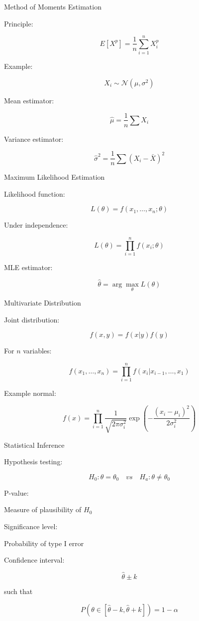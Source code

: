\documentclass[aspectratio=169]{beamer}
\begin{document}
\begin{frame}{Method of Moments Estimation}

Principle:

\[
E[X^p] =
\frac{1}{n}
\sum_{i=1}^{n} X_i^p
\]

Example:

\[
X_i \sim \mathcal{N}(\mu,\sigma^2)
\]

Mean estimator:

\[
\hat{\mu} =
\frac{1}{n}\sum X_i
\]

Variance estimator:

\[
\hat{\sigma}^2 =
\frac{1}{n}\sum (X_i-\bar{X})^2
\]

\end{frame}

\begin{frame}{Maximum Likelihood Estimation}

Likelihood function:

\[
L(\theta) =
f(x_1,\dots,x_n;\theta)
\]

Under independence:

\[
L(\theta) =
\prod_{i=1}^{n} f(x_i;\theta)
\]

MLE estimator:

\[
\hat{\theta} =
\arg\max_\theta L(\theta)
\]

\end{frame}

\begin{frame}{Multivariate Distribution}

Joint distribution:

\[
f(x,y) = f(x|y)f(y)
\]

For $n$ variables:

\[
f(x_1,\dots,x_n)
=
\prod_{i=1}^{n}
f(x_i|x_{i-1},\dots,x_1)
\]

Example normal:

\[
f(x)
=
\prod_{i=1}^{n}
\frac{1}{\sqrt{2\pi\sigma_i^2}}
\exp
\left(
-\frac{(x_i-\mu_i)^2}{2\sigma_i^2}
\right)
\]

\end{frame}

\begin{frame}{Statistical Inference}

Hypothesis testing:

\[
H_0:\theta=\theta_0
\quad vs \quad
H_a:\theta\neq\theta_0
\]

P-value:

Measure of plausibility of $H_0$

Significance level:

Probability of type I error

Confidence interval:

\[
\hat{\theta} \pm k
\]

such that

\[
P(\theta \in [\hat{\theta}-k,\hat{\theta}+k]) = 1-\alpha
\]

\end{frame}
\end{document}
